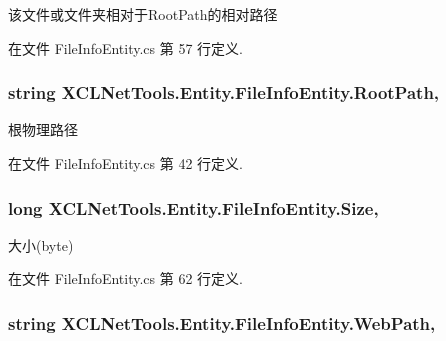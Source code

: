 该文件或文件夹相对于\-Root\-Path的相对路径 



在文件 File\-Info\-Entity.\-cs 第 57 行定义.

\hypertarget{class_x_c_l_net_tools_1_1_entity_1_1_file_info_entity_a6ef4c659747c605379a43168ae1d64f6}{
\subsubsection[{Root\-Path}]{\setlength{\rightskip}{0pt plus 5cm}string X\-C\-L\-Net\-Tools.\-Entity.\-File\-Info\-Entity.\-Root\-Path\hspace{0.3cm}{\ttfamily [get]}, {\ttfamily [set]}}}\label{class_x_c_l_net_tools_1_1_entity_1_1_file_info_entity_a6ef4c659747c605379a43168ae1d64f6}


根物理路径 



在文件 File\-Info\-Entity.\-cs 第 42 行定义.

\hypertarget{class_x_c_l_net_tools_1_1_entity_1_1_file_info_entity_a7447a43994e75793388e160a626ba346}{
\subsubsection[{Size}]{\setlength{\rightskip}{0pt plus 5cm}long X\-C\-L\-Net\-Tools.\-Entity.\-File\-Info\-Entity.\-Size\hspace{0.3cm}{\ttfamily [get]}, {\ttfamily [set]}}}\label{class_x_c_l_net_tools_1_1_entity_1_1_file_info_entity_a7447a43994e75793388e160a626ba346}


大小(byte) 



在文件 File\-Info\-Entity.\-cs 第 62 行定义.

\hypertarget{class_x_c_l_net_tools_1_1_entity_1_1_file_info_entity_ab93bd802770bb40cc0abdfd35d2fbbc6}{
\subsubsection[{Web\-Path}]{\setlength{\rightskip}{0pt plus 5cm}string X\-C\-L\-Net\-Tools.\-Entity.\-File\-Info\-Entity.\-Web\-Path\hspace{0.3cm}{\ttfamily [get]}, {\ttfamily [set]}}}\label{class_x_c_l_net_tools_1_1_entity_1_1_file_info_entity_ab93bd802770bb40cc0abdfd35d2fbbc6}


